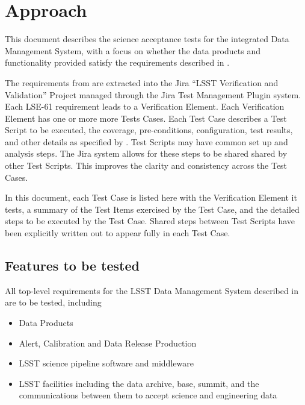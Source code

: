 \documentclass[DM,lsstdraft,STS,toc]{lsstdoc}
\begin{document}
\section{Approach}
\label{sec:approach}

This document describes the science acceptance tests for the integrated Data Management System,
with a focus on whether the data products and functionality provided satisfy the requirements described in .

The requirements from  are extracted into the Jira ``LSST Verification and Validation'' Project managed through the Jira Test Management Plugin system.  Each LSE-61 requirement leads to a Verification Element.  Each Verification Element has one or more more Tests Cases.  Each Test Case describes a Test Script to be executed, the coverage, pre-conditions, configuration, test results, and other details as specified by .
Test Scripts may have common set up and analysis steps.  The Jira system allows for these steps to be shared shared by other Test Scripts.  This improves the clarity and consistency across the Test Cases.

In this document, each Test Case is listed here with the Verification Element it tests, a summary of the Test Items exercised by the Test Case, and the detailed steps to be executed by the Test Case.  Shared steps between Test Scripts have been explicitly written out to appear fully in each Test Case.

\subsection{Features to be tested}
\label{sec:feat2test}

All top-level requirements for the LSST Data Management System described in  are to be tested, including
\begin{itemize}
\item Data Products
\item Alert, Calibration and Data Release Production
\item LSST science pipeline software and middleware
\item LSST facilities including the data archive, base, summit, and the communications between them to accept science and engineering data
\end{itemize}
\end{document}
